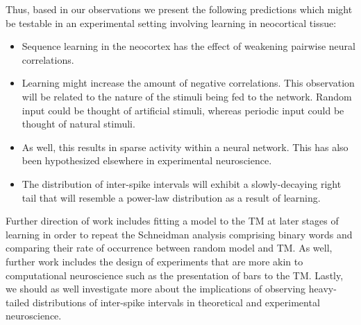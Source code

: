 \documentclass[11pt,letterpaper]{article}
\begin{document}
        Thus, based in our observations we present the following predictions which might be testable in 
        an experimental setting involving learning in neocortical tissue:
        \begin{itemize}
            \item Sequence learning in the neocortex has the effect of weakening pairwise neural correlations.
            \item Learning might increase the amount of negative correlations. This observation will
            be related to the nature of the stimuli being fed to the network.
            Random input could be thought of artificial stimuli, whereas periodic input could be thought of
            natural stimuli.
            \item As well, this results in sparse activity within a neural network. This has also been
            hypothesized elsewhere in experimental neuroscience.            
            \item The distribution of inter-spike intervals will exhibit a slowly-decaying right tail
            that will resemble a power-law distribution as a result of learning.
        \end{itemize}
        
        Further direction of work includes fitting a model to the TM at later stages of learning in order to
        repeat the Schneidman analysis comprising binary words and comparing their rate of occurrence between
        random model and TM. As well, further work includes the design of experiments that are more akin
        to computational neuroscience such as the presentation of bars to the TM.
        Lastly, we should as well investigate more about the implications of observing heavy-tailed distributions
        of inter-spike intervals in theoretical and experimental neuroscience.
    
    
    
    
\end{document}
